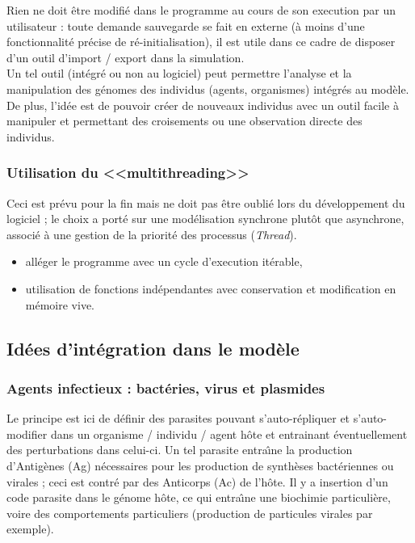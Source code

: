 \documentclass[11pt,twoside,a4paper]{article}
\begin{document}
Rien ne doit {\^e}tre modifi{\'e} dans le programme au cours de son execution par un utilisateur : toute demande sauvegarde se fait en externe ({\`a} moins d'une fonctionnalit{\'e} pr{\'e}cise de r{\'e}-initialisation), il est utile dans ce cadre de disposer d'un outil d'import / export dans la simulation.~\\

Un tel outil (int{\'e}gr{\'e} ou non au logiciel) peut permettre l'analyse et la manipulation des g{\'e}nomes des individus (agents, organismes) int{\'e}gr{\'e}s au mod{\`e}le. De plus, l'id{\'e}e est de pouvoir cr{\'e}er de nouveaux individus avec un outil facile {\`a} manipuler et permettant des croisements ou une observation directe des individus. 

\subsubsection{Utilisation du <<multithreading>>}

Ceci est pr{\'e}vu pour la fin mais ne doit pas {\^e}tre oubli{\'e} lors du d{\'e}veloppement du logiciel ; le choix a port{\'e} sur une mod{\'e}lisation synchrone plut{\^o}t que asynchrone, associ{\'e} {\`a} une gestion de la priorit{\'e} des processus (\textit{Thread}).
\begin{itemize}
	\item all{\'e}ger le programme avec un cycle d'execution it{\'e}rable, 
	\item utilisation de fonctions ind{\'e}pendantes avec conservation et modification en m{\'e}moire vive.
\end{itemize}

\subsection{Id{\'e}es d'int{\'e}gration dans le mod{\`e}le}

\subsubsection{Agents infectieux : bact{\'e}ries, virus et plasmides}

Le principe est ici de d{\'e}finir des parasites pouvant s'auto-r{\'e}pliquer et s'auto-modifier dans un organisme / individu / agent h{\^o}te et entrainant {\'e}ventuellement des perturbations dans celui-ci. Un tel parasite entra{\^\i}ne la production d'Antig{\`e}nes (Ag) n{\'e}cessaires pour les production de synth{\`e}ses bact{\'e}riennes ou virales ; ceci est contr{\'e} par des Anticorps (Ac) de l'h{\^o}te. Il y a insertion d'un code parasite dans le g{\'e}nome h{\^o}te, ce qui entra{\^\i}ne une biochimie particuli{\`e}re, voire des comportements particuliers (production de particules virales par exemple).~\\
\end{document}
